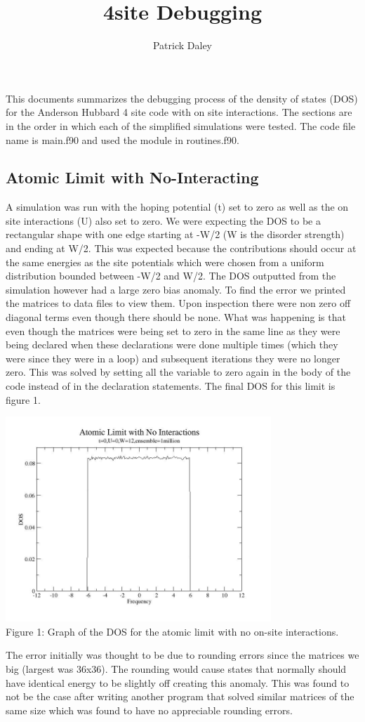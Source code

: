 \documentclass{article}
\title{4site Debugging}
\author{Patrick Daley}
\begin{document}
	
\maketitle
	
This documents summarizes the debugging process of the density of states (DOS) for the Anderson Hubbard 4 site code with on site interactions. The sections are in the order in which each of the simplified simulations were tested. The code file name is main.f90 and used the module in routines.f90.

\subsection*{Atomic Limit with No-Interacting}

A simulation was run with the hoping potential (t) set to zero as well as the on site interactions (U) also set to zero. We were expecting the DOS to be a rectangular shape with one edge starting at -W/2 (W is the disorder strength) and ending at W/2. This was expected because the contributions should occur at the same energies as the site potentials which were chosen from a uniform distribution bounded between -W/2 and W/2. The DOS outputted from the simulation however had a large zero bias anomaly. To find the error we printed the matrices to data files to view them. Upon inspection there were non zero off diagonal terms even though there should be none. What was happening is that even though the matrices were being set to zero in the same line as they were being declared when these declarations were done multiple times (which they were since they were in a loop) and subsequent iterations they were no longer zero. This was solved by setting all the variable to zero again in the body of the code instead of in the declaration statements. The final DOS for this limit is figure 1.

\begin{center}
\includegraphics [width=10cm]{dos_t0u0w12.jpg} \\
Figure 1: Graph of the DOS for the atomic limit with no on-site interactions. 
\end{center}
\smallskip
The error initially  was thought to be due to rounding errors since the matrices we big (largest was 36x36). The rounding would cause states that normally should have identical energy to be slightly off creating this anomaly. This was found to not be the case after writing another program that solved similar matrices of the same size which was found to have no appreciable rounding errors.
\end{document}
